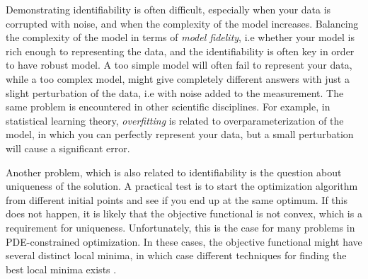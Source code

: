 Demonstrating identifiability is 
often difficult, especially when your data is corrupted with noise,
and when the complexity of the model increases. Balancing the
complexity of the model in terms of \emph{model fidelity}, i.e whether
your 
model is rich enough to representing the data, and the identifiability
is often key in order to have robust model. A too simple model will
often fail to represent your data, while a too complex model, might
give completely different answers with just a slight perturbation of
the data, i.e with noise added to the measurement. The same problem is
encountered in other scientific disciplines. For example, in
statistical learning theory, \emph{overfitting} is related to
overparameterization of the model, in which you can perfectly
represent your data, but a small perturbation will cause a significant
error.

Another problem, which is also related to identifiability is
the question about uniqueness of the solution. A practical test is to
start the optimization algorithm from different initial points and see
if you end up at the same optimum. If this does not happen, it is
likely that the objective functional is not convex, which is a
requirement for uniqueness. Unfortunately, this is the case for many
problems in PDE-constrained optimization. In these cases, the objective
functional might have several distinct local minima, in which case
different techniques for finding the best local minima exists
\cite{farrell2015multiple}. 










